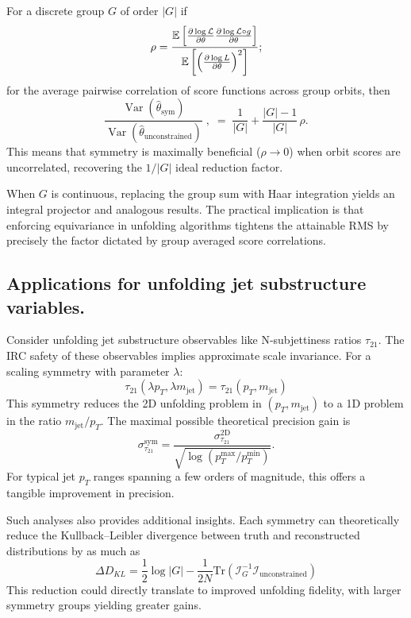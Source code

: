 \begin{theorem}
\noproofref
For a discrete group \(G\) of order \(|G|\) if  
\[\rho=\frac{\operatorname{\mathbb{E}}\qty[\pdv{\log \mathcal L}{\theta}\pdv{\log \mathcal L\circ g}{\theta}]}{\operatorname{\mathbb{E}}\qty[\qty(\pdv{\log L}{\theta})^2]};
\] for the average pairwise correlation of score functions across group orbits,  
then
\[
  \frac{\operatorname{Var}(\hat\theta_{\text{sym}})}
       {\operatorname{Var}(\hat\theta_{\text{unconstrained}})}\;,
  \;=\;
  \frac{1}{|G|}+\frac{|G|-1}{|G|}\,\rho.
\]
This means that symmetry is maximally beneficial (\(\rho \to 0\)) when orbit scores are uncorrelated, recovering the \(1/|G|\) ideal reduction factor.
\end{theorem}

When \(G\) is continuous, replacing the group sum with Haar integration yields an integral projector and analogous results.
%
The practical implication is that enforcing equivariance in unfolding algorithms tightens the attainable RMS by precisely the factor dictated by group averaged score correlations.


    \subsection{Applications for unfolding jet substructure variables.}
        Consider unfolding jet substructure observables like N-subjettiness ratios \(\tau_{21}\).
        The IRC safety of these observables implies approximate scale invariance.
        For a scaling symmetry with parameter \(\lambda\):
        \[
            \tau_{21}(\lambda p_T, \lambda m_\text{jet}) = \tau_{21}(p_T, m_\text{jet})
        \]
        This symmetry reduces the 2D unfolding problem in \((p_T, m_\text{jet})\) to a 1D problem in the ratio \(m_\text{jet}/p_T\).
        The maximal possible theoretical precision gain is
        \[
            \sigma_{\tau_{21}}^\text{sym} = \frac{\sigma_{\tau_{21}}^\text{2D}}{\sqrt{\log(p_T^\text{max}/p_T^\text{min})}}.
        \]
        For typical jet \(p_T\) ranges spanning a few orders of magnitude, this offers a tangible improvement in precision.

        Such analyses also provides additional insights.
        Each symmetry can theoretically reduce the Kullback--Leibler divergence between truth and reconstructed distributions by as much as
        \[
            \Delta D_{KL} = \frac{1}{2} \log |G| - \frac{1}{2N} \text{Tr}(\mathcal{I}_G^{-1} \mathcal{I}_\text{unconstrained})
        \]
        This reduction could directly translate to improved unfolding fidelity, with larger symmetry groups yielding greater gains.

